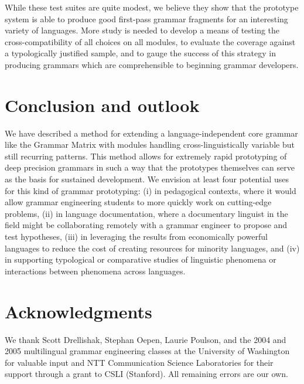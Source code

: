 \documentclass[11pt]{article}
\begin{document}
While these test suites are quite modest, we believe they show that
the prototype system is able to produce good first-pass grammar
fragments for an interesting variety of languages.  More study is
needed to develop a means of testing the
cross-compatibility of all choices on all modules, to evaluate
the coverage against a typologically justified sample,
and to gauge the success of this strategy in producing 
grammars which are comprehensible to beginning grammar developers.

\section{Conclusion and outlook}

We have described a method for extending a language-independent core
grammar like the Grammar Matrix with modules handling
cross-linguistically variable but still recurring patterns.  This
method allows for extremely rapid prototyping of deep precision
grammars in such a way that the prototypes themselves can serve as the
basis for sustained development.  We envision at least four potential
uses for this kind of grammar prototyping: (i) in pedagogical
contexts, where it would allow grammar engineering students to more
quickly work on cutting-edge problems, (ii) in language documentation,
where a documentary linguist in the field might be collaborating
remotely with a grammar engineer to propose and test hypotheses, (iii)
in leveraging the results from economically powerful languages to
reduce the cost of creating resources for minority languages, 
and (iv) in supporting typological or
comparative studies of linguistic phenomena or interactions between
phenomena across languages.

\section*{Acknowledgments}

We thank Scott Drellishak, Stephan Oepen, Laurie Poulson, and the 2004
and 2005 multilingual grammar engineering classes at the University of
Washington for valuable input and NTT Communication Science
Laboratories for their support through a grant to CSLI (Stanford). All
remaining errors are our own.


     
\end{document}
